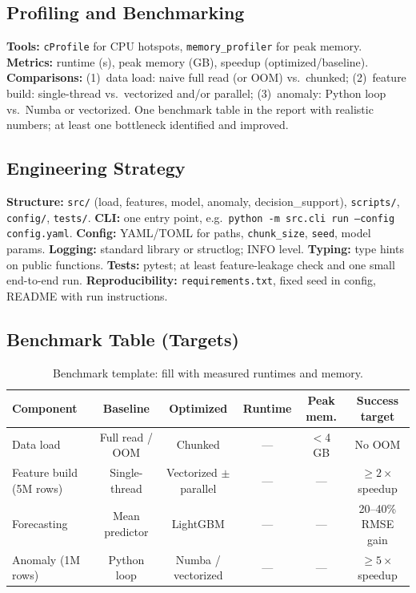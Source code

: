 \subsection{Profiling and Benchmarking}
\textbf{Tools:} \texttt{cProfile} for CPU hotspots, \texttt{memory\_profiler} for peak memory. \textbf{Metrics:} runtime (s), peak memory (GB), speedup (optimized/baseline). \textbf{Comparisons:} (1)~data load: naive full read (or OOM) vs.\ chunked; (2)~feature build: single-thread vs.\ vectorized and/or parallel; (3)~anomaly: Python loop vs.\ Numba or vectorized. One benchmark table in the report with realistic numbers; at least one bottleneck identified and improved.

\subsection{Engineering Strategy}
\textbf{Structure:} \texttt{src/} (load, features, model, anomaly, decision\_support), \texttt{scripts/}, \texttt{config/}, \texttt{tests/}. \textbf{CLI:} one entry point, e.g.\ \texttt{python -m src.cli run --config config.yaml}. \textbf{Config:} YAML/TOML for paths, \texttt{chunk\_size}, \texttt{seed}, model params. \textbf{Logging:} standard library or structlog; INFO level. \textbf{Typing:} type hints on public functions. \textbf{Tests:} pytest; at least feature-leakage check and one small end-to-end run. \textbf{Reproducibility:} \texttt{requirements.txt}, fixed seed in config, README with run instructions.

\subsection{Benchmark Table (Targets)}
\begin{table}[h]
\centering
\small
\begin{tabular}{@{}lccccc@{}}
\toprule
\textbf{Component} & \textbf{Baseline} & \textbf{Optimized} & \textbf{Runtime} & \textbf{Peak mem.} & \textbf{Success target} \\
\midrule
Data load & Full read / OOM & Chunked & --- & $<$4\,GB & No OOM \\
Feature build (5M rows) & Single-thread & Vectorized $\pm$ parallel & --- & --- & $\geq 2\times$ speedup \\
Forecasting & Mean predictor & LightGBM & --- & --- & 20--40\% RMSE gain \\
Anomaly (1M rows) & Python loop & Numba / vectorized & --- & --- & $\geq 5\times$ speedup \\
\bottomrule
\end{tabular}
\caption{Benchmark template: fill with measured runtimes and memory.}
\end{table}

